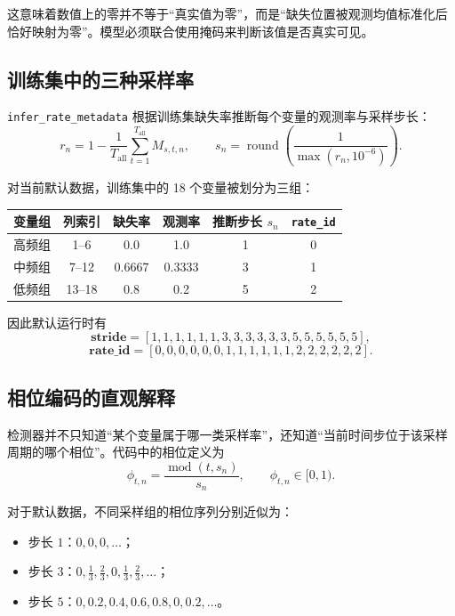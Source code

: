 \documentclass[UTF8]{ctexart}
\begin{document}
这意味着数值上的零并不等于“真实值为零”，而是“缺失位置被观测均值标准化后恰好映射为零”。模型必须联合使用掩码来判断该值是否真实可见。

\subsection{训练集中的三种采样率}

\texttt{infer\_rate\_metadata} 根据训练集缺失率推断每个变量的观测率与采样步长：
\begin{equation}
    r_n = 1 - \frac{1}{T_{\text{all}}}\sum_{t=1}^{T_{\text{all}}} M_{s,t,n},
    \qquad
    s_n = \operatorname{round}\!\left(\frac{1}{\max(r_n,10^{-6})}\right).
\end{equation}

对当前默认数据，训练集中的 18 个变量被划分为三组：

\begin{center}
\small
\begin{tabular}{cccccc}
\toprule
变量组 & 列索引 & 缺失率 & 观测率 & 推断步长 \(s_n\) & \texttt{rate\_id} \\
\midrule
高频组 & 1--6 & 0.0 & 1.0 & 1 & 0 \\
中频组 & 7--12 & 0.6667 & 0.3333 & 3 & 1 \\
低频组 & 13--18 & 0.8 & 0.2 & 5 & 2 \\
\bottomrule
\end{tabular}
\end{center}

因此默认运行时有
\begin{equation}
    \bm{stride} = [1,1,1,1,1,1,3,3,3,3,3,3,5,5,5,5,5,5],
\end{equation}
\begin{equation}
    \bm{rate\_id} = [0,0,0,0,0,0,1,1,1,1,1,1,2,2,2,2,2,2].
\end{equation}

\subsection{相位编码的直观解释}

检测器并不只知道“某个变量属于哪一类采样率”，还知道“当前时间步位于该采样周期的哪个相位”。代码中的相位定义为
\begin{equation}
    \phi_{t,n} = \frac{\operatorname{mod}(t,s_n)}{s_n},
    \qquad
    \phi_{t,n} \in [0,1).
\end{equation}

对于默认数据，不同采样组的相位序列分别近似为：
\begin{itemize}
    \item 步长 \(1\)：\(0,0,0,\dots\)；
    \item 步长 \(3\)：\(0,\frac{1}{3},\frac{2}{3},0,\frac{1}{3},\frac{2}{3},\dots\)；
    \item 步长 \(5\)：\(0,0.2,0.4,0.6,0.8,0,0.2,\dots\)。
\end{itemize}
\end{document}
